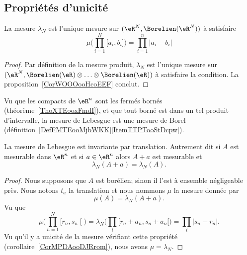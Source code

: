 \subsection{Propriétés d'unicité}

\begin{corollary}       \label{CorMPDAooDJRrom}
    La mesure \( \lambda_N\) est l'unique mesure sur \(   (\eR^N,  \Borelien(\eR^N) )   \) à satisfaire
    \begin{equation}
        \mu\big( \prod_{i=1}^N\mathopen[ a_i , b_i \mathclose] \big)=\prod_{i=1}^n| a_i-b_i |
    \end{equation}
\end{corollary}

\begin{proof}
    Par définition de la mesure produit, \( \lambda_N\) est l'unique mesure sur \(   (\eR^N,  \Borelien(\eR)\otimes\ldots\otimes\Borelien(\eR) )   \) à satisfaire la condition. La proposition~\ref{CorWOOOooHcoEEF} conclut.
\end{proof}

Vu que les compacts de \( \eR^n\) sont les fermés bornés (théorème~\ref{ThoXTEooxFmdI}), et que tout borné est dans un tel produit d'intervalle, la mesure de Lebesgue est une mesure de Borel (définition~\ref{DefFMTEooMjbWKK}\ref{ItemTTPTooStDcpw}).

\begin{theorem}        \label{THOooTMWHooThsDHj}
    La mesure de Lebesgue est invariante par translation. Autrement dit si \( A\) est mesurable dans \( \eR^n\) et si \( a\in \eR^n\) alors \( A+a\) est mesurable et
    \begin{equation}
        \lambda_N(A+a)=\lambda_N(A).
    \end{equation}
\end{theorem}

\begin{proof}
    Nous supposons que \( A\) est borélien; sinon il l'est à ensemble négligeable près. Nous notons \( t_a\) la translation et nous nommons \( \mu\) la mesure donnée par
    \begin{equation}
        \mu(A)=\lambda_N(A+a).
    \end{equation}
    Vu que
    \begin{equation}
        \mu\big( \prod_{n=1}^N\mathopen[ r_n , s_n \mathclose[ \big)=\lambda_N\big( \prod_i\mathopen[ r_n+a_n , s_n+a_n [ \big)=\prod_i| s_n-r_n |.
    \end{equation}
    Vu qu'il y a unicité de la mesure vérifiant cette propriété (corollaire~\ref{CorMPDAooDJRrom}), nous avons \( \mu=\lambda_N\).
\end{proof}

